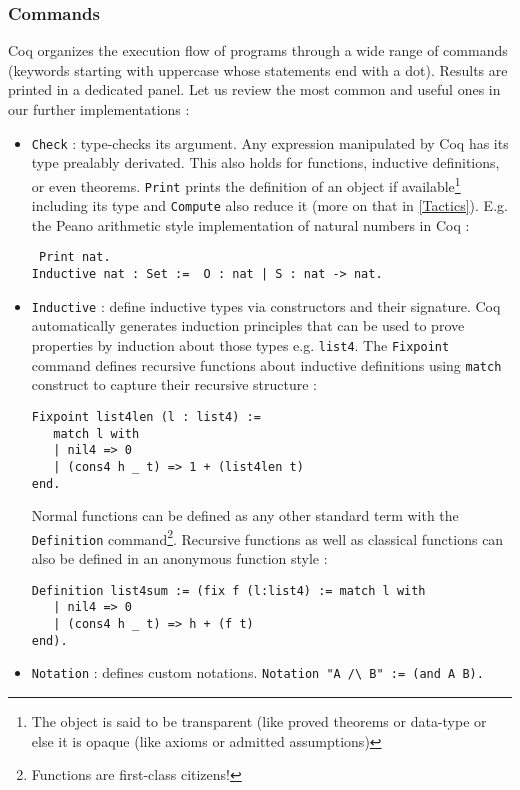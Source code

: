 \documentclass{article}
\begin{document}
        \subsubsection{Commands}
        Coq organizes the execution flow of programs through a wide range of commands (keywords starting with uppercase whose statements end with a dot). Results are printed in a dedicated panel. Let us review the most common and useful ones in our further implementations :
        \begin{itemize}
            \item \texttt{Check} : type-checks its argument. Any expression manipulated by Coq has its type prealably derivated. This also holds for functions, inductive definitions, or even theorems. \texttt{Print} prints the definition of an object if available\footnote{The object is said to be transparent (like proved theorems or data-type or else it is opaque (like axioms or admitted assumptions)} including its type and \texttt{Compute} also reduce it (more on that in \ref{Tactics}). E.g. the Peano arithmetic style implementation of natural numbers in Coq :
            \begin{verbatim} Print nat.
Inductive nat : Set :=  O : nat | S : nat -> nat. \end{verbatim}
            \item  \texttt{Inductive} : define inductive types via constructors and their signature. Coq automatically generates induction principles that can be used to prove properties by induction about those types e.g. \texttt{list4}.
            The \texttt{Fixpoint} command defines recursive functions about inductive definitions using \texttt{match} construct to capture their recursive structure :
            \begin{verbatim}
Fixpoint list4len (l : list4) :=
   match l with
   | nil4 => 0
   | (cons4 h _ t) => 1 + (list4len t)
end.\end{verbatim}
            Normal functions can be defined as any other standard term with the \texttt{Definition} command\footnote{Functions are first-class citizens!}. Recursive functions as well as classical functions can also be defined in an anonymous function style :
            \begin{verbatim}Definition list4sum := (fix f (l:list4) := match l with
   | nil4 => 0
   | (cons4 h _ t) => h + (f t)
end).\end{verbatim}

            \item \texttt{Notation} : defines custom notations. \verb|Notation "A /\ B" := (and A B).|


\end{itemize}
\end{document}

